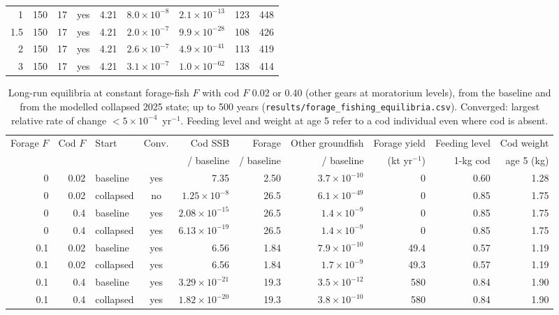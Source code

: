 \documentclass[11pt,letterpaper,fleqn]{article}
\newcommand{\yr}{yr$^{-1}$}
\begin{document}
\begin{table}[p]
\begin{adjustbox}{max width=\textwidth}
\begin{tabular}{@{}rrrcrrrrr@{}}
1 & 150 & 17 & yes & 4.21 & $8.0\times10^{-8}$ & $2.1\times10^{-13}$ & 123 & 448\\
1.5 & 150 & 17 & yes & 4.21 & $2.0\times10^{-7}$ & $9.9\times10^{-28}$ & 108 & 426\\
2 & 150 & 17 & yes & 4.21 & $2.6\times10^{-7}$ & $4.9\times10^{-41}$ & 113 & 419\\
3 & 150 & 17 & yes & 4.21 & $3.1\times10^{-7}$ & $1.0\times10^{-62}$ & 138 & 414\\
\bottomrule\end{tabular}\end{adjustbox}\end{table}
\begin{table}[p]\caption{Long-run equilibria at constant forage-fish $F$ with cod $F$ 0.02 or 0.40 (other gears at moratorium levels), from the baseline and from the modelled collapsed 2025 state; up to 500 years (\nolinkurl{results/forage_fishing_equilibria.csv}). Converged: largest relative rate of change $<5\times10^{-4}$~\yr{}. Feeding level and weight at age 5 refer to a cod individual even where cod is absent.}\label{tab:S-equil}
\centering\scriptsize\begin{adjustbox}{max width=\textwidth}\begin{tabular}{@{}rrlcrrrrrr@{}}\toprule
Forage $F$ & Cod $F$ & Start & Conv. & Cod SSB & Forage & Other groundfish & Forage yield & Feeding level & Cod weight\\
 & & & & / baseline & / baseline & / baseline & (kt yr$^{-1}$) & 1-kg cod & age 5 (kg)\\\midrule
0 & 0.02 & baseline & yes & 7.35 & 2.50 & $3.7\times10^{-10}$ & 0 & 0.60 & 1.28\\
0 & 0.02 & collapsed & no & $1.25\times10^{-8}$ & 26.5 & $6.1\times10^{-49}$ & 0 & 0.85 & 1.75\\
0 & 0.4 & baseline & yes & $2.08\times10^{-15}$ & 26.5 & $1.4\times10^{-9}$ & 0 & 0.85 & 1.75\\
0 & 0.4 & collapsed & yes & $6.13\times10^{-19}$ & 26.5 & $1.4\times10^{-9}$ & 0 & 0.85 & 1.75\\
0.1 & 0.02 & baseline & yes & 6.56 & 1.84 & $7.9\times10^{-10}$ & 49.4 & 0.57 & 1.19\\
0.1 & 0.02 & collapsed & yes & 6.56 & 1.84 & $1.7\times10^{-9}$ & 49.3 & 0.57 & 1.19\\
0.1 & 0.4 & baseline & yes & $3.29\times10^{-21}$ & 19.3 & $3.5\times10^{-12}$ & 580 & 0.84 & 1.90\\
0.1 & 0.4 & collapsed & yes & $1.82\times10^{-20}$ & 19.3 & $3.8\times10^{-10}$ & 580 & 0.84 & 1.90\\

\end{tabular}
\end{adjustbox}
\end{table}
\end{document}
